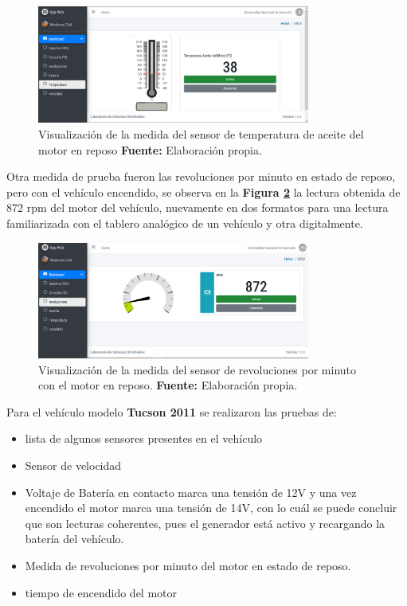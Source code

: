  \begin{figure}[H]
	\centering
	\includegraphics[width=0.8\textwidth]{./Cap6imagen/temp_fig_c6.png}
	\caption [Visualización de la medida del sensor de temperatura de aceite del motor en reposo.]{Visualización de la medida del sensor de temperatura de aceite del motor en reposo \textbf{ Fuente:} %
		Elaboración propia.}
	\label{temp_ref_c6} %
\end{figure}

Otra medida de prueba fueron las revoluciones por minuto en estado de reposo, pero con el vehículo encendido, se observa en la \textbf{Figura \ref{rpm_ref_c6}} la lectura obtenida de 872 rpm del motor del vehículo, nuevamente en dos formatos para una lectura familiarizada con el tablero analógico de un vehículo y otra digitalmente. 

\begin{figure}[H]
	\centering
	\includegraphics[width=0.8\textwidth]{./Cap6imagen/rpm_fig_c6.png}
	\caption [Visualización de la medida del sensor de revoluciones por minuto con el motor en reposo.]{Visualización de la medida del sensor de revoluciones por minuto con el motor en reposo.  \textbf{ Fuente:} %
		Elaboración propia.}
	\label{rpm_ref_c6} %
\end{figure}


Para el vehículo modelo \textbf{Tucson 2011} se realizaron las pruebas de: 


\begin{itemize}
    \item lista de algunos sensores presentes en el vehículo
    \item Sensor de velocidad
    \item Voltaje de Batería en contacto marca una tensión de 12V y una vez encendido el motor marca una tensión de 14V, con lo cuál se puede concluir que son lecturas coherentes, pues el generador está activo y recargando la batería del vehículo. 
    \item Medida de revoluciones por minuto del motor en estado de reposo. 
    \item tiempo de encendido del motor
\end{itemize}

